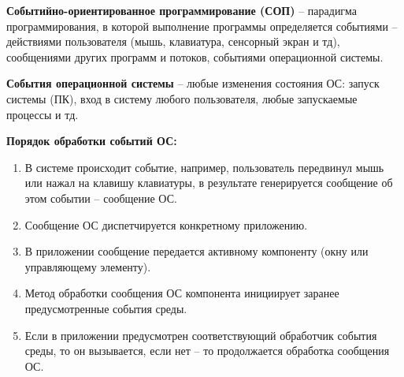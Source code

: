 {\bf{Событийно-ориентированное программирование (СОП)}} – парадигма программирования, в которой выполнение программы определяется событиями – действиями пользователя (мышь, клавиатура, сенсорный экран и тд), сообщениями других программ и потоков, событиями операционной системы.

{\bf{События операционной системы}} – любые изменения состояния ОС: запуск системы (ПК), вход в систему любого пользователя, любые запускаемые процессы и тд.

{\bf{Порядок обработки событий ОС:}}
\begin{enumerate}
    \item В системе происходит событие, например, пользователь передвинул мышь или нажал на клавишу клавиатуры, в результате генерируется сообщение об этом событии – сообщение ОС. 
    \item Сообщение ОС диспетчируется конкретному приложению.
    \item В приложении сообщение передается активному компоненту (окну или управляющему элементу). 
    \item Метод обработки сообщения ОС компонента инициирует заранее предусмотренные события среды.
    \item Если в приложении предусмотрен соответствующий обработчик события среды, то он вызывается, если нет – то продолжается обработка сообщения ОС.     
\end{enumerate}

